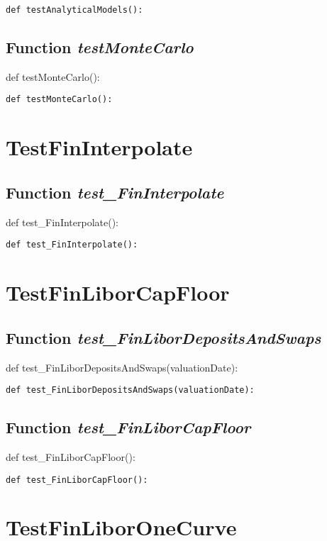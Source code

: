 \documentclass[twoside,11pt]{book}
\begin{document}
\begin{lstlisting}
def testAnalyticalModels():
\end{lstlisting}

\subsection{Function {\it testMonteCarlo}}
def testMonteCarlo():

\begin{lstlisting}
def testMonteCarlo():
\end{lstlisting}


\newpage
\section{TestFinInterpolate}

\subsection{Function {\it test\_FinInterpolate}}
def test\_FinInterpolate():

\begin{lstlisting}
def test_FinInterpolate():
\end{lstlisting}


\newpage
\section{TestFinLiborCapFloor}

\subsection{Function {\it test\_FinLiborDepositsAndSwaps}}
def test\_FinLiborDepositsAndSwaps(valuationDate):

\begin{lstlisting}
def test_FinLiborDepositsAndSwaps(valuationDate):
\end{lstlisting}

\subsection{Function {\it test\_FinLiborCapFloor}}
def test\_FinLiborCapFloor():

\begin{lstlisting}
def test_FinLiborCapFloor():
\end{lstlisting}


\newpage
\section{TestFinLiborOneCurve}
\end{document}
